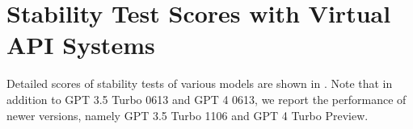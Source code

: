 \section{Stability Test Scores with Virtual API Systems}
\label{app:detailed_stability_test_virtual}
Detailed scores of stability tests of various models are shown in . Note that in addition to GPT 3.5 Turbo 0613 and GPT 4 0613, we report the performance of newer versions, namely GPT 3.5 Turbo 1106 and GPT 4 Turbo Preview.
\begin{table}[]
    \centering
    \small
    \caption{Performance change when manually make APIs down with our virtual online API system. The results are averaged over all six groups. Solving rates are reported. We run each experiment one time and evaluate three times and take the average score.}
    \label{tab:simulated_api_stability_test}
\end{table}




